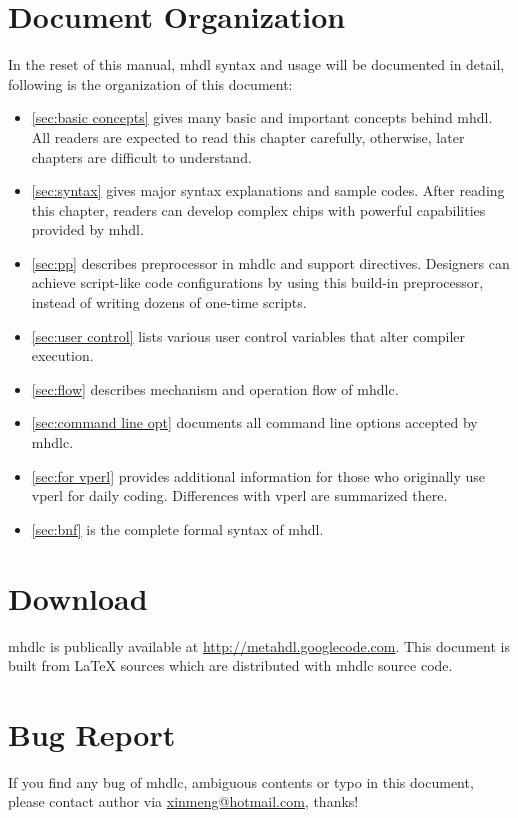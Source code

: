 \section{Document Organization}
In the reset of this manual, \gls{mhdl} syntax and usage will be
documented in detail, following is the organization of this document:
\begin{itemize}
\item \autoref{sec:basic concepts} gives many basic and important concepts
behind \gls{mhdl}. All readers are expected to read this chapter
carefully, otherwise, later chapters are difficult to understand.
\item \autoref{sec:syntax} gives major syntax explanations and sample codes. 
After reading this chapter, readers can develop complex chips with
powerful capabilities provided by \gls{mhdl}.
\item \autoref{sec:pp} describes preprocessor in \gls{mhdlc} and
  support directives. Designers can 
achieve script-like code configurations by using this build-in
preprocessor, instead of writing dozens of one-time scripts.
\item \autoref{sec:user control} lists various user control
  variables that alter compiler execution. 
\item \autoref{sec:flow} describes mechanism and operation flow of \gls{mhdlc}.
\item \autoref{sec:command line opt} documents all 
  command line options accepted by \gls{mhdlc}.
\item \autoref{sec:for vperl} provides additional information for those who originally use \gls{vperl}
for daily coding. Differences with \gls{vperl} are summarized there.
\item \autoref{sec:bnf} is the complete formal syntax of \gls{mhdl}.
\end{itemize}

\section{Download}
\gls{mhdlc} is publically available at \url{http://metahdl.googlecode.com}.
This document is built from \LaTeX{} sources which are distributed with \gls{mhdlc}
source code. 

\section{Bug Report}
If you find any bug of \gls{mhdlc}, ambiguous contents or typo in this
document, please contact author via
\href{mailto:xinmeng@hotmail.com}{xinmeng@hotmail.com}, thanks!



